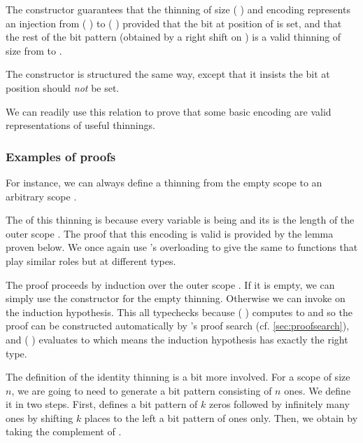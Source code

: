 The  constructor guarantees that the thinning of
size ( ) and encoding 
represents an injection
from ( \IdrisData{:<} )
to ( \IdrisData{:<} )
provided that the bit at position  of 
is set, and that the rest of the bit pattern (obtained by a right shift
on ) is a valid thinning of size  from
 to .

The  constructor is structured the same way, except that
it insists the bit at position  should \emph{not} be set.

We can readily use this relation to prove that some basic encoding are
valid representations of useful thinnings.

\subsubsection{Examples of  proofs}

For instance, we can always define a thinning from the empty scope to
an arbitrary scope .


The  of this thinning is  because
every variable is being and its  is
the length of the outer scope .
%
The proof that this encoding is valid is provided by
the  lemma proven below.
%
We once again use \idris{}'s overloading
to give the same to functions that play similar roles but at
different types.


The proof proceeds by induction over the outer scope . If it
is empty, we can simply use the constructor for the empty thinning.
%
Otherwise we can invoke  on the induction hypothesis.
%
This all typechecks because (  )
computes to  and so the  proof can be constructed
automatically by \idris{}'s proof search (cf. \cref{sec:proofsearch}),
%
and (  ) evaluates to 
which means the induction hypothesis has exactly the right type.


The definition of the identity thinning is a bit more involved.
%
For a scope of size $n$, we are going to need to generate a bit pattern
consisting of $n$ ones.
%
We define it in two steps.
%
First,  defines a bit pattern of $k$ zeros followed by
infinitely many ones by shifting $k$ places to the left a bit pattern of ones only.
%
Then, we obtain  by taking the complement of .

